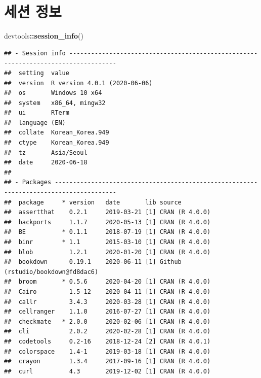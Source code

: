\documentclass[
  10pt,
]{krantz}
\makeatletter
\newenvironment{Shaded}{\begin{snugshade}}{\end{snugshade}}
\newcommand{\KeywordTok}[1]{\textcolor[rgb]{0.13,0.29,0.53}{\textbf{#1}}}
\newcommand{\NormalTok}[1]{#1}
\newcommand{\OperatorTok}[1]{\textcolor[rgb]{0.81,0.36,0.00}{\textbf{#1}}}
\newenvironment{kframe}{%
\medskip{}
\setlength{\fboxsep}{.8em}
 \def\at@end@of@kframe{}%
 \ifinner\ifhmode%
  \def\at@end@of@kframe{\end{minipage}}%
  \begin{minipage}{\columnwidth}%
 \fi\fi%
 \def\FrameCommand##1{\hskip\@totalleftmargin \hskip-\fboxsep
 \colorbox{shadecolor}{##1}\hskip-\fboxsep
     \hskip-\linewidth \hskip-\@totalleftmargin \hskip\columnwidth}%
 \MakeFramed {\advance\hsize-\width
   \@totalleftmargin\z@ \linewidth\hsize
   \@setminipage}}%
 {\par\unskip\endMakeFramed%
 \at@end@of@kframe}
\renewenvironment{Shaded}{\begin{kframe}}{\end{kframe}}
\makeatother
\begin{document}
\hypertarget{session-info}{%
\chapter{세션 정보}\label{session-info}}

\begin{Shaded}
\begin{Highlighting}[]
\NormalTok{devtools}\OperatorTok{::}\KeywordTok{session\_info}\NormalTok{()}
\end{Highlighting}
\end{Shaded}

\begin{verbatim}
## - Session info -----------------------------------------------------------------------------------
##  setting  value                       
##  version  R version 4.0.1 (2020-06-06)
##  os       Windows 10 x64              
##  system   x86_64, mingw32             
##  ui       RTerm                       
##  language (EN)                        
##  collate  Korean_Korea.949            
##  ctype    Korean_Korea.949            
##  tz       Asia/Seoul                  
##  date     2020-06-18                  
## 
## - Packages ---------------------------------------------------------------------------------------
##  package     * version   date       lib source                           
##  assertthat    0.2.1     2019-03-21 [1] CRAN (R 4.0.0)                   
##  backports     1.1.7     2020-05-13 [1] CRAN (R 4.0.0)                   
##  BE          * 0.1.1     2018-07-19 [1] CRAN (R 4.0.0)                   
##  binr        * 1.1       2015-03-10 [1] CRAN (R 4.0.0)                   
##  blob          1.2.1     2020-01-20 [1] CRAN (R 4.0.0)                   
##  bookdown      0.19.1    2020-06-11 [1] Github (rstudio/bookdown@fd8dac6)
##  broom       * 0.5.6     2020-04-20 [1] CRAN (R 4.0.0)                   
##  Cairo         1.5-12    2020-04-11 [1] CRAN (R 4.0.0)                   
##  callr         3.4.3     2020-03-28 [1] CRAN (R 4.0.0)                   
##  cellranger    1.1.0     2016-07-27 [1] CRAN (R 4.0.0)                   
##  checkmate   * 2.0.0     2020-02-06 [1] CRAN (R 4.0.0)                   
##  cli           2.0.2     2020-02-28 [1] CRAN (R 4.0.0)                   
##  codetools     0.2-16    2018-12-24 [2] CRAN (R 4.0.1)                   
##  colorspace    1.4-1     2019-03-18 [1] CRAN (R 4.0.0)                   
##  crayon        1.3.4     2017-09-16 [1] CRAN (R 4.0.0)                   
##  curl          4.3       2019-12-02 [1] CRAN (R 4.0.0)                   

\end{verbatim}
\end{document}
